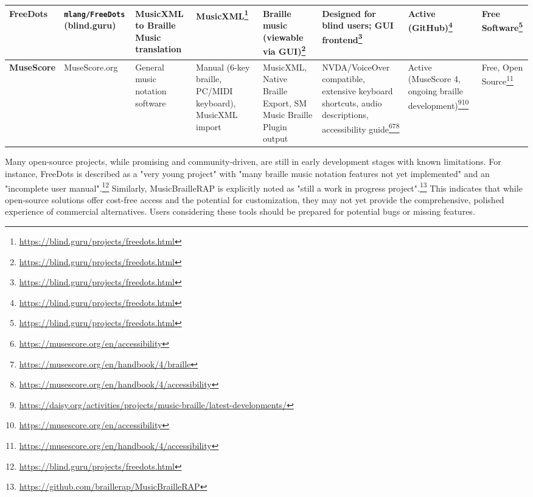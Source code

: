 \begin{longtable}{|p{2.5cm}|p{2.5cm}|p{3.5cm}|p{2.5cm}|p{2.5cm}|p{3.5cm}|p{2.5cm}|p{2.5cm}|}
\hline
\textbf{FreeDots} & \texttt{mlang/FreeDots} (blind.guru) & MusicXML to Braille Music translation & MusicXML\footnote{\url{https://blind.guru/projects/freedots.html}} & Braille music (viewable via GUI)\footnote{\url{https://blind.guru/projects/freedots.html}} & Designed for blind users; GUI frontend\footnote{\url{https://blind.guru/projects/freedots.html}} & Active (GitHub)\footnote{\url{https://blind.guru/projects/freedots.html}} & Free Software\footnote{\url{https://blind.guru/projects/freedots.html}} \\
\hline
\textbf{MuseScore} & MuseScore.org & General music notation software & Manual (6-key braille, PC/MIDI keyboard), MusicXML import & MusicXML, Native Braille Export, SM Music Braille Plugin output & NVDA/VoiceOver compatible, extensive keyboard shortcuts, audio descriptions, accessibility guide\footnote{\url{https://musescore.org/en/accessibility}}\footnote{\url{https://musescore.org/en/handbook/4/braille}}\footnote{\url{https://musescore.org/en/handbook/4/accessibility}} & Active (MuseScore 4, ongoing braille development)\footnote{\url{https://daisy.org/activities/projects/music-braille/latest-developments/}}\footnote{\url{https://musescore.org/en/accessibility}} & Free, Open Source\footnote{\url{https://musescore.org/en/handbook/4/accessibility}} \\
\hline
\end{longtable}

Many open-source projects, while promising and community-driven, are still in early development stages with known limitations. For instance, FreeDots is described as a "very young project" with "many braille music notation features not yet implemented" and an "incomplete user manual".\footnote{\url{https://blind.guru/projects/freedots.html}} Similarly, MusicBrailleRAP is explicitly noted as "still a work in progress project".\footnote{\url{https://github.com/braillerap/MusicBrailleRAP}} This indicates that while open-source solutions offer cost-free access and the potential for customization, they may not yet provide the comprehensive, polished experience of commercial alternatives. Users considering these tools should be prepared for potential bugs or missing features.

